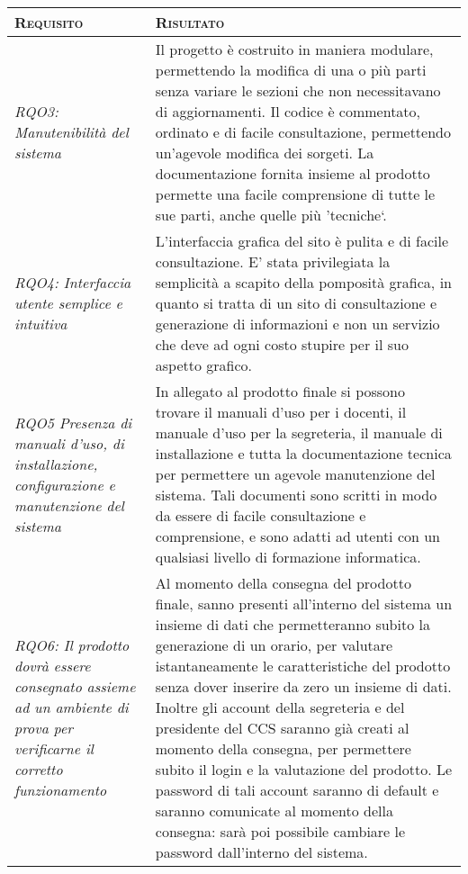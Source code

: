 \documentclass[11pt,a4paper]{article}
\begin{document}
\newpage
\begin{center}
\begin{tabular}{|p{}|p{}|}
\hline
\textsc{Requisito} & \textsc{Risultato} \\
\hline
\hline
\textit{RQO3: Manutenibilità del sistema} & Il progetto è costruito in maniera modulare, permettendo la modifica di una o più parti senza variare
	le sezioni che non necessitavano di aggiornamenti. Il codice è commentato, ordinato e di facile consultazione, permettendo un'agevole modifica 
	dei sorgeti. La documentazione fornita insieme al prodotto permette una facile comprensione di tutte le sue parti, anche quelle più 'tecniche`.  \\
\hline
\textit{RQO4: Interfaccia utente semplice e intuitiva} & L'interfaccia grafica del sito è pulita e di facile consultazione. E' stata privilegiata la
	semplicità a scapito della pomposità grafica, in quanto si tratta di un sito di consultazione e generazione di informazioni e non un servizio che deve ad ogni costo stupire per il suo aspetto grafico. \\
\hline
\textit{RQO5 Presenza di manuali d’uso, di installazione, configurazione e manutenzione del sistema} & In allegato al prodotto finale si possono trovare
	il manuali d'uso per i docenti, il manuale d'uso per la segreteria, il manuale di installazione e tutta la documentazione tecnica per permettere
	un agevole manutenzione del sistema. Tali documenti sono scritti in modo da essere di facile consultazione e comprensione, e sono adatti ad
	utenti con un qualsiasi livello di formazione informatica.  \\
\hline
\textit{RQO6: Il prodotto dovrà essere consegnato assieme ad un ambiente di prova per verificarne il corretto funzionamento} & Al momento della
	consegna del prodotto finale, sanno presenti all'interno del sistema un insieme di dati che permetteranno subito la generazione di un
	orario, per valutare istantaneamente le caratteristiche del prodotto senza dover inserire da zero un insieme di dati. Inoltre gli account
	della segreteria e del presidente del CCS saranno già creati al momento della consegna, per permettere subito il login e la valutazione
	del prodotto. Le password di tali account saranno di default e saranno comunicate al momento della consegna: sarà poi possibile cambiare
	le password dall'interno del sistema.  \\
\hline
\end{tabular}
\end{center}
\end{document}
